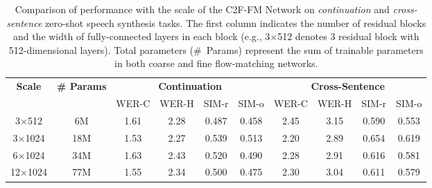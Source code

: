 

\begin{table}[h!]



  \caption{Comparison of performance with the scale of the C2F-FM Network on \textit{continuation} and \textit{cross-sentence} zero-shot speech synthesis tasks. The first column indicates the number of residual blocks and the width of fully-connected layers in each block (e.g., 3×512 denotes 3 residual block with 512-dimensional layers). Total parameters (\#~Params) represent the sum of trainable parameters in both coarse and fine flow-matching networks.}
  \label{tab:FMnet}

  \centering 
    \resizebox{0.92\textwidth}{!}
  {
  \begin{tabular}{ cc cccc cccc}

    \toprule[1pt]
 \multirow{2}{*}{\textbf{Scale}} &\multirow{2}{*}{\textbf{\# Params}}& \multicolumn{4}{c}{\textbf{Continuation}} & \multicolumn{4}{c}{\textbf{Cross-Sentence}} \\
 \cmidrule(r){3-6} \cmidrule(r){7-10}
     & & WER-C  & WER-H  & SIM-r & SIM-o   & WER-C  & WER-H &  SIM-r & SIM-o   \\
 \midrule
   3×512& 6M & 1.61& 2.28& 0.487 & 0.458  &2.45 & 3.15 &0.590  &    0.553    \\
   3×1024& 18M  & 1.53 & 2.27 & 0.539 & 0.513  & 2.20 & 2.89 & 0.654 & 0.619 \\
   6×1024& 34M  & 1.63 & 2.43 & 0.520 & 0.490  & 2.28 & 2.91 & 0.616 & 0.581 \\
   12×1024& 77M &1.55 &2.34  &0.500 &0.475  &2.30 &3.04 &0.611  & 0.579  \\		 	 		 	 					
\bottomrule[1pt]
\end{tabular}

}


\end{table}

